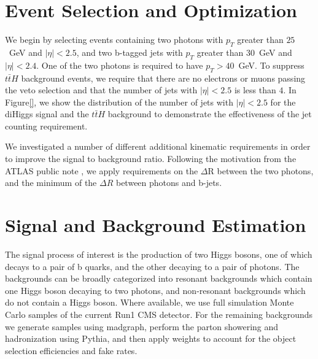\documentclass{cmspaper}
\begin{document}



\section{Event Selection and Optimization}
\label{sec:eventselection}
 
We begin by selecting events containing two photons with $p_{T}$ greater than $25$~GeV
and $|\eta|<2.5$, and two b-tagged jets with $p_{T}$ greater than $30$~GeV and $|\eta|<2.4$.
One of the two photons is required to have $p_{T} > 40$~GeV. To suppress $t\bar{t}H$ background
events, we require that there are no electrons or muons passing the veto selection and that 
the number of jets with $|\eta|<2.5$ is less than $4$. In Figure\ref{}, we show the distribution
of the number of jets with $|\eta|<2.5$ for the diHiggs signal and the $t\bar{t}H$ background
to demonstrate the effectiveness of the jet counting requirement.

We investigated a number of different additional kinematic requirements in order to improve the
signal to background ratio. Following the motivation from the ATLAS public note \cite{ATLASHHToBBGG},
we apply requirements on the $\Delta$R between the two photons, and the minimum of the 
$\Delta R$ between photons and b-jets. 



\section{Signal and Background Estimation}
\label{sec:bkgestimation}
The signal process of interest is the production of two Higgs bosons, one of which decays to a pair of b quarks, 
and the other decaying to a pair of photons. 
The backgrounds can be broadly categorized into resonant backgrounds which contain one Higgs boson 
decaying to two photons, and non-resonant backgrounds which do not contain a Higgs boson. 
Where available, we use full simulation Monte Carlo samples of the current Run1 CMS detector.
For the remaining backgrounds we generate samples using madgraph, perform the parton showering and
hadronization using Pythia, and then apply weights to account for the object selection efficiencies
and fake rates.
\end{document}
